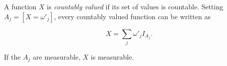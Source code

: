 A function $X$ is \textit{countably valued} if its set of values is countable. Setting $A_j = [X = \omega'_j]$, every countably valued function can be written as

$$X = \sum_j \omega'_j I_{A_j}.$$

If the $A_j$ are measurable, $X$ is measurable.
